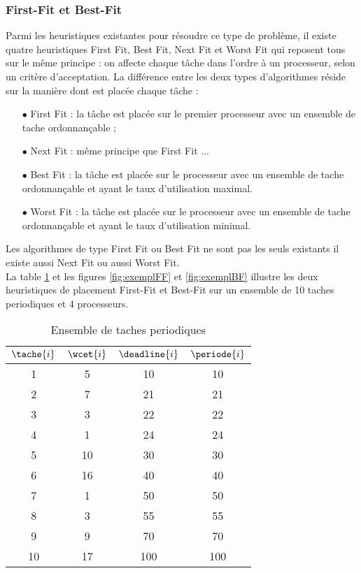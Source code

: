 \subsubsection{First-Fit et Best-Fit}
\vspace{-1cm}
Parmi les heuristiques existantes pour résoudre ce type de problème, il existe quatre heuristiques First Fit, Best Fit, Next Fit et Worst Fit qui reposent tous sur le même principe : on affecte chaque tâche dans l'ordre à un processeur, selon un critère d'acceptation.
La différence entre les deux types d'algorithmes réside sur la manière dont est placée chaque tâche :
\begin{itemize}
\item[$\bullet$] First Fit : la tâche est placée sur le premier processeur avec un ensemble de tache ordonnançable ;
\item[$\bullet$] Next Fit : même principe que First Fit ...
\item[$\bullet$] Best Fit : la tâche est placée sur le processeur avec un ensemble de tache ordonnançable et ayant le taux d'utilisation maximal.
\item[$\bullet$] Worst Fit : la tâche est placée sur le processeur avec un ensemble de tache ordonnançable et ayant le taux d'utilisation minimal.
\end{itemize}
Les algorithmes de type First Fit ou Best Fit ne sont pas les seuls existants il existe aussi Next Fit ou aussi Worst Fit.
\\ \indent La table \ref{tab:exampleFFBF} et les figures \ref{fig:exemplFF} et \ref{fig:exemplBF} illustre les deux heuristiques de placement First-Fit et Best-Fit sur un ensemble de 10 taches periodiques et 4 processeurs.

\begin{table}[!h]
\begin{center}
\begin{tabular}{|c|c|c|c|}
 \hline$\tache{i}$ & $\wcet{i}$ & $\deadline{i}$ & $\periode{i}$ \\ 
 \hline1 & 5 & 10 & 10 \\ 
 \hline 2 & 7 & 21 & 21 \\ 
 \hline 3 & 3 & 22 & 22 \\ 
 \hline 4 & 1 & 24 & 24 \\ 
 \hline 5 & 10 & 30 & 30 \\ 
 \hline 6 & 16 & 40 & 40 \\ 
 \hline 7 & 1 & 50 & 50 \\ 
 \hline 8 & 3 & 55 & 55 \\ 
 \hline 9 & 9 & 70 & 70 \\ 
 \hline 10 & 17 & 100 & 100 \\ 
 \hline 
 \end{tabular}
\end{center}
\caption{Ensemble de taches periodiques} \label{tab:exampleFFBF}
\end{table}

